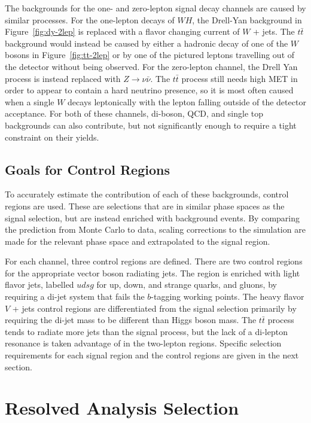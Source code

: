 The backgrounds for the one- and zero-lepton signal decay channels are
caused by similar processes.
For the one-lepton decays of $WH$, the Drell-Yan background in Figure~\ref{fig:dy-2lep}
is replaced with a flavor changing current of $W$ + jets.
The $t\bar{t}$ background would instead be caused by either a hadronic decay of
one of the $W$ bosons in Figure~\ref{fig:tt-2lep}
or by one of the pictured leptons travelling out of the detector without being observed.
For the zero-lepton channel, the Drell Yan process is instead replaced with
$Z \rightarrow \nu\bar{\nu}$.
The $t\bar{t}$ process still needs high MET in order to appear to
contain a hard neutrino presence,
so it is most often caused when a single $W$ decays leptonically with the lepton
falling outside of the detector acceptance.
For both of these channels, di-boson, QCD, and single top backgrounds can also contribute,
but not significantly enough to require a tight constraint on their yields.

\subsection{Goals for Control Regions}

To accurately estimate the contribution of each of these backgrounds,
control regions are used.
These are selections that are in similar phase spaces as the signal selection,
but are instead enriched with background events.
By comparing the prediction from Monte Carlo to data,
scaling corrections to the simulation are made for the relevant phase space and extrapolated to the signal region.

For each channel, three control regions are defined.
There are two control regions for the appropriate vector boson radiating jets.
The region is enriched with light flavor jets, labelled $udsg$ for
up, down, and strange quarks, and gluons, by requiring a di-jet system that fails
the $b$-tagging working points.
The heavy flavor $V$ + jets control regions are differentiated from the signal selection
primarily by requiring the di-jet mass to be different than Higgs boson mass.
The $t\bar{t}$ process tends to radiate more jets than the signal process,
but the lack of a di-lepton resonance is taken advantage of in the two-lepton regions.
Specific selection requirements for each signal region and the control regions are given in the next section.

\section{Resolved Analysis Selection}

